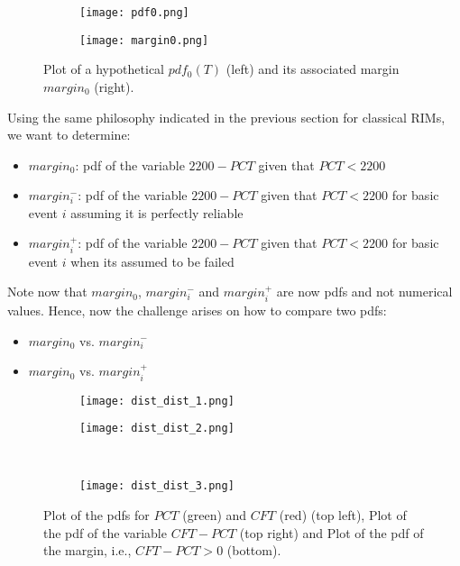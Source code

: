 \begin{figure}
  \centering
  \begin{subfigure}{.5\textwidth}
    \centering
    \centerline{\texttt{[image: pdf0.png]}}
  \end{subfigure}%
  \begin{subfigure}{.5\textwidth}
    \centering
    \centerline{\texttt{[image: margin0.png]}}
  \end{subfigure}
  \caption{Plot of a hypothetical $pdf_0(T)$ (left) and its associated margin $margin_0$ (right).}
  \label{fig:margin0}
\end{figure}
 
Using the same philosophy indicated in the previous section for classical RIMs, we want 
to determine:
\begin{itemize}
  \item $margin_0$: pdf of the variable $2200-PCT$ given that $PCT<2200$
  \item $margin_i^-$: pdf of the variable $2200-PCT$ given that $PCT<2200$ for basic 
                      event $i$ assuming it is perfectly reliable
  \item $margin_i^+$: pdf of the variable $2200-PCT$ given that $PCT<2200$ for basic event 
                      $i$ when its assumed to be failed
\end{itemize}

Note now that $margin_0$, $margin_i^-$ and $margin_i^+$ are now pdfs and not numerical values. 
Hence, now the challenge arises on how to compare two pdfs:
\begin{itemize}
  \item $margin_0$ vs. $margin_i^-$
  \item $margin_0$ vs. $margin_i^+$
\end{itemize}

\begin{figure}
  \begin{subfigure}{.5\linewidth}
  \centering
  \texttt{[image: dist\_dist\_1.png]}
  \end{subfigure}%
  \begin{subfigure}{.5\linewidth}
  \centering
  \texttt{[image: dist\_dist\_2.png]}
  \end{subfigure}\\[1ex]
  \begin{subfigure}{\linewidth}
  \centering
  \texttt{[image: dist\_dist\_3.png]}
  \end{subfigure}
  \caption{Plot of the pdfs for $PCT$ (green) and $CFT$ (red) (top left), 
           Plot of the pdf of the variable $CFT-PCT$ (top right) and 
           Plot of the pdf of the margin, i.e., $CFT-PCT>0$ (bottom).}
  \label{fig:dist_dist}
\end{figure}

